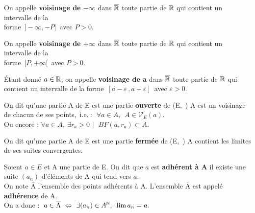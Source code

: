 On appelle \textbf{voisinage de \(-\infty\)} dans \(\overline{\mathbb{R}}\) toute partie de \(\mathbb{R}\) qui contient un intervalle de la\\
forme \(\,]-\!\infty,-P]\,\) avec \(P>0\).\vspace{0.1cm}

On appelle \textbf{voisinage de \(+\infty\)} dans \(\overline{\mathbb{R}}\) toute partie de \(\mathbb{R}\) qui contient un intervalle de la\\
forme \(\,[P,+\infty[\,\) avec \(P>0\).\vspace{0.1cm}

Étant donné \(a\in \mathbb{R}\), on appelle \textbf{voisinage de a} dans \(\overline{\mathbb{R}}\) toute partie de \(\mathbb{R}\) qui contient un intervalle de la forme \(\,[a-\varepsilon\,,a+\varepsilon]\,\) avec \(\varepsilon>0\).

\vspace{1.6cm}

On dit qu'une partie A de E est une partie \textbf{ouverte} de (E,\ \normtxt{\ }) \ssi A est un voisinage de chacun de ses points,\, i.e. : \(\ \forall a\in A,\ \; A\in \mathcal{V}_E(a) \).\vspace{0.1cm}\\
Ou encore : \(\forall a\in A,\ \exists r_a>0 \ \mid \ BF(a,r_a)\subset A. \)

\vspace{1.3cm}

On dit qu'une partie A de E est une partie \textbf{fermée} de (E,\ \normtxt{\ }) \ssi A contient les limites de ses suites convergentes.

\vspace{1.5cm}

Soient \(a\in E\) et A une partie de E. On dit que \(a\) est \textbf{adhérent à A} \ssi il existe une suite \((a_n)\) d'éléments de A qui tend vers $a$.\vspace{0.1cm}\\
On note \(\overline{\text{A}}\) l'ensemble des points adhérents à A. L'ensemble \(\overline{\text{A}}\) est appelé \textbf{adhérence} de A.\vspace{0.1cm}\\
On a donc : \(\;a\in \overline{\text{A}}\  \Leftrightarrow \ \exists(a_n)\in A^{\mathbb{N}},\ \,\lim a_n = a. \)

\vspace{0.7cm}

